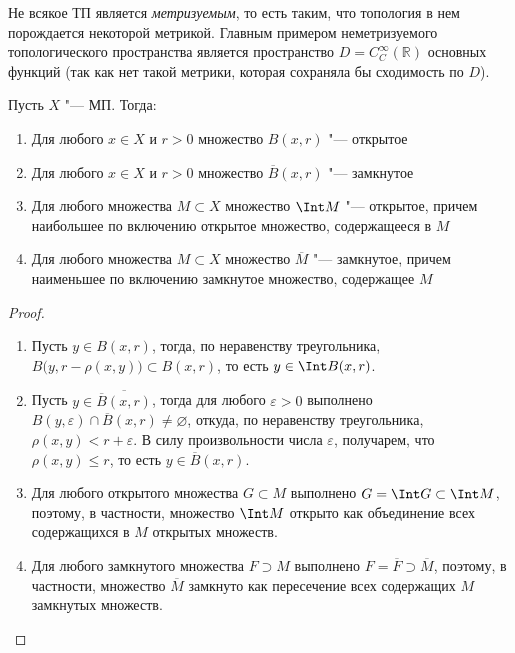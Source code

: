\begin{note}
	Не всякое ТП является \textit{метризуемым}, то есть таким, что топология в нем порождается некоторой метрикой. Главным примером неметризуемого топологического пространства является пространство $D = C_C^{\infty}(\mathbb{R})$ основных функций (так как нет такой метрики, которая сохраняла бы сходимость по $D$).
\end{note}

\begin{theorem}\label{thm1.3}
	Пусть $X$ "--- МП. Тогда:
	\begin{enumerate}
		\item Для любого $x \in X$ и $r > 0$ множество $B(x, r)$ "--- открытое
		\item Для любого $x \in X$ и $r > 0$ множество $\overline B(x, r)$ "--- замкнутое
		\item Для любого множества $M \subset X$ множество $\Int M$ "--- открытое, причем наибольшее по включению открытое множество, содержащееся в $M$
		\item Для любого множества $M \subset X$ множество $\overline M$ "--- замкнутое, причем наименьшее по включению замкнутое множество, содержащее $M$
	\end{enumerate}
\end{theorem}

\begin{proof}~
	\begin{enumerate}
		\item Пусть $y \in B(x, r)$, тогда, по неравенству треугольника, $B\big(y, r - \rho(x, y)\big) \subset B(x, r)$, то есть $y \in \Int B(x, r)$.
		
		\item Пусть $y \in \overline{\overline B(x, r)}$, тогда для любого $\varepsilon > 0$ выполнено $B(y, \varepsilon) \cap \overline B(x, r) \neq \varnothing$, откуда, по неравенству треугольника, $\rho(x, y) < r + \varepsilon$. В силу произвольности числа $\varepsilon$, получарем, что $\rho(x, y) \leqslant r$, то есть $y \in \overline B(x, r)$.
		
		\item Для любого открытого множества $G \subset M$ выполнено $G = \Int G \subset \Int M$, поэтому, в частности, множество $\Int M$ открыто как объединение всех содержащихся в $M$ открытых множеств.
  
		\item Для любого замкнутого множества $F \supset M$ выполнено $F = \overline F \supset \overline M$, поэтому, в частности, множество $\overline M$ замкнуто как пересечение всех содержащих $M$ замкнутых множеств.\qedhere
	\end{enumerate}
\end{proof}

